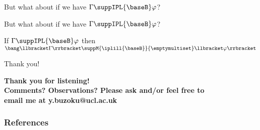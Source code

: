 \documentclass{beamer}
\begin{document}
\begin{frame}
	\begin{center}
		But what about if we have $\Gamma\suppIPL{\baseB}\varphi$?
	\end{center}
\end{frame}
\begin{frame}
	\begin{center}
		But what about if we have $\Gamma\suppIPL{\baseB}\varphi$?
		\vspace{1cm}
		\begin{theorem}
			If $\Gamma\suppIPL{\baseB}\varphi$ then $\bang\llbracket\Gamma\rrbracket\suppM{\iplill{\baseB}}{\emptymultiset}\llbracket\varphi\rrbracket$
		\end{theorem}
	\end{center}
\end{frame}
\begin{frame}{Thank you!}
	\begin{center}
		\textbf{Thank you for listening! \\ 
		Comments? Observations? Please ask and/or feel free to \\
		email me at y.buzoku@ucl.ac.uk}
	\end{center}
\end{frame}
\begin{frame}[allowframebreaks]
	\frametitle{References}
	\nocite{*}
	
	
\end{frame}
\end{document}
